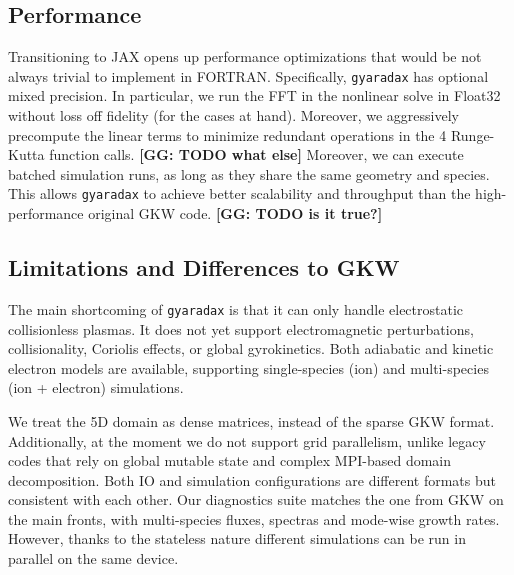 \documentclass{article}
\theoremstyle{plain}
\theoremstyle{definition}
\theoremstyle{remark}
\newcommand{\GG}[1]{\textcolor{jaxtealdark}{\textbf{[GG: #1]}}}
\begin{document}
\subsection{Performance}
Transitioning to JAX opens up performance optimizations that would be not always trivial to implement in FORTRAN. Specifically, \texttt{gyaradax} has optional mixed precision. In particular, we run the FFT in the nonlinear solve in Float32 without loss off fidelity (for the cases at hand).
Moreover, we aggressively precompute the linear terms to minimize redundant operations in the 4 Runge-Kutta function calls. \GG{TODO what else}
%
Moreover, we can execute batched simulation runs, as long as they share the same geometry and species.
This allows \texttt{gyaradax} to achieve better scalability and throughput than the high-performance original GKW code. \GG{TODO is it true?}

\subsection{Limitations and Differences to GKW}
The main shortcoming of \texttt{gyaradax} is that it can only handle electrostatic collisionless plasmas. It does not yet support electromagnetic perturbations, collisionality, Coriolis effects, or global gyrokinetics.
%
Both adiabatic and kinetic electron models are available, supporting single-species (ion) and multi-species (ion + electron) simulations.

We treat the 5D domain as dense matrices, instead of the sparse GKW format. Additionally, at the moment we do not support grid parallelism, unlike legacy codes that rely on global mutable state and complex MPI-based domain decomposition.
Both IO and simulation configurations are different formats but consistent with each other. Our diagnostics suite matches the one from GKW on the main fronts, with multi-species fluxes, spectras and mode-wise growth rates.
%
However, thanks to the stateless nature different simulations can be run in parallel on the same device.
\end{document}

